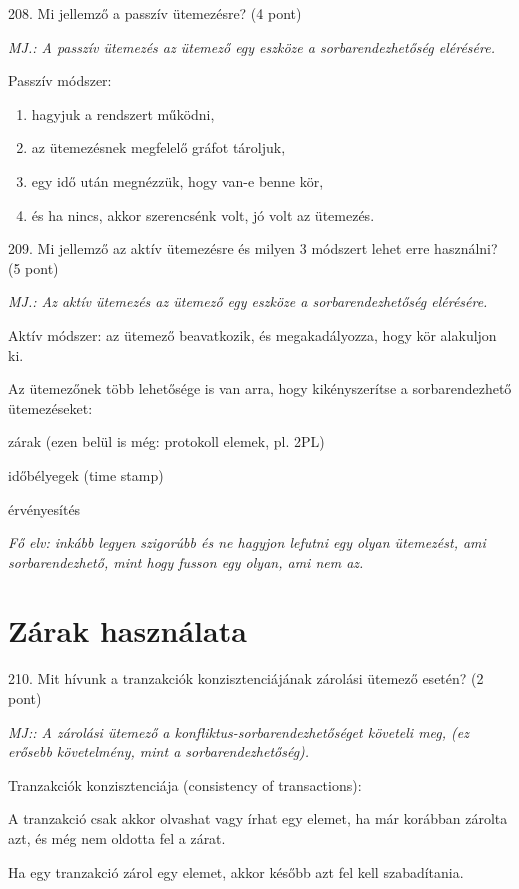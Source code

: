 \documentclass[a4paper,11.5pt, table]{article}
\begin{document}
208. Mi jellemző a passzív ütemezésre? (4 pont)
	\begin{compactitem}
		\item \textit{MJ.: A passzív ütemezés az ütemező egy eszköze a sorbarendezhetőség elérésére.}
		\item Passzív módszer: 
		\begin{enumerate}
			\item hagyjuk a rendszert működni, 
			\item az ütemezésnek megfelelő gráfot tároljuk, 
			\item egy idő után megnézzük, hogy van-e benne kör, 
			\item és ha nincs, akkor szerencsénk volt, jó volt az ütemezés.
		\end{enumerate}
	\end{compactitem}

209. Mi jellemző az aktív ütemezésre és milyen 3 módszert lehet erre használni? (5 pont)
	\begin{compactitem}
		\item \textit{MJ.: Az aktív ütemezés az ütemező egy eszköze a sorbarendezhetőség elérésére.}
		\item Aktív módszer: az ütemező beavatkozik, és megakadályozza, hogy kör alakuljon ki. 
		\item Az ütemezőnek több lehetősége is van arra, hogy kikényszerítse a sorbarendezhető ütemezéseket:
		\begin{compactitem}
			\item zárak (ezen belül is még: protokoll elemek, pl. 2PL)
			\item időbélyegek (time stamp)
			\item érvényesítés
		\end{compactitem}
		\item \textit{Fő elv: inkább legyen szigorúbb és ne hagyjon lefutni egy olyan ütemezést, ami sorbarendezhető, mint hogy fusson egy olyan, ami nem az.}
	\end{compactitem}

\section{Zárak használata}

210. Mit hívunk a tranzakciók konzisztenciájának zárolási ütemező esetén? (2 pont)
	\begin{compactitem}
		\item \textit{MJ:: A zárolási ütemező a konfliktus-sorbarendezhetőséget követeli meg, (ez erősebb követelmény, mint a sorbarendezhetőség).}
		\item Tranzakciók konzisztenciája (consistency of transactions):
		\begin{compactitem}
			\item A tranzakció csak akkor olvashat vagy írhat egy elemet, ha már korábban zárolta azt, és még nem oldotta fel a zárat.
			\item Ha egy tranzakció zárol egy elemet, akkor később azt fel kell szabadítania.
		\end{compactitem}
	\end{compactitem}
	
\end{document}
